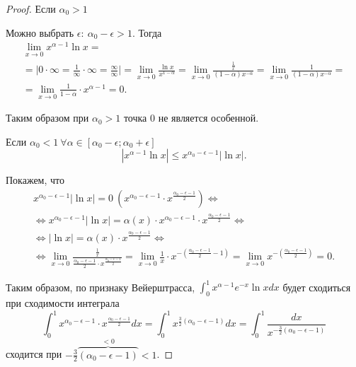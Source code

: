 \begin{enumerate}
\begin{proof}
            Если $ \alpha_0 > 1 $

            Можно выбрать $ \epsilon : \ \alpha_0 - \epsilon > 1 $. Тогда
            \begin{multline*}
                \underset{x \rightarrow 0}{\lim}x^{\alpha-1}\ln x = \\
                = \bigg|0 \cdot \infty = \frac{1}{\infty}\cdot \infty = \frac{\infty}{\infty}\bigg| = \underset{x \rightarrow 0}{\lim}\frac{\ln x}{x^{1-\alpha}} = \underset{x \rightarrow 0}{\lim} \frac{\frac{1}{x}}{(1-\alpha)x^{-\alpha}} = \underset{x \rightarrow 0}{\lim}\frac{1}{(1-\alpha)x^{-\alpha}} = \\
                = \underset{x \rightarrow 0}{\lim}\frac{1}{1-\alpha}\cdot x^{\alpha-1} = 0.
            \end{multline*}

            Таким образом при $ \alpha_0 > 1 $ точка $ 0 $ не является особенной.

            Если $ \alpha_0 < 1 \ \forall \alpha \in[\alpha_0 - \epsilon;\alpha_0 + \epsilon] $
            \[
                | x^{\alpha-1}\ln x | \leqslant x^{\alpha_0 - \epsilon -1}| \ln x |.
            \]

            Покажем, что
            \begin{multline*}
                x^{\alpha_0 - \epsilon - 1}| \ln x | = 0 \ \left(x^{\alpha_0 - \epsilon - 1}\cdot x^{\frac{\alpha_0 - \epsilon - 1}{2}}\right) \iff \\
                \iff x^{\alpha_0 - \epsilon - 1}| \ln x |  = \alpha(x)\cdot x^{\alpha_0 - \epsilon - 1} \cdot x^{\frac{\alpha_0 - \epsilon - 1}{2}} \iff \\
                \iff | \ln x | = \alpha(x) \cdot x^{\frac{\alpha_0 - \epsilon - 1}{2}} \iff \\
                \iff \underset{x \rightarrow 0}{\lim}\frac{\frac{1}{x}}{\frac{\alpha_0 - \epsilon - 1}{2}\cdot x^{\frac{\alpha_0 - \epsilon - 1}{2}}} = \underset{x \rightarrow 0}{\lim}\frac{1}{x}\cdot x^{-\left(\frac{\alpha_0 - \epsilon - 1}{2} - 1\right)} = \underset{x \rightarrow 0}{\lim} x^{-\left(\frac{\alpha_0 - \epsilon -1}{2}\right)} = 0.
            \end{multline*}

            Таким образом, по признаку Вейерштрасса, $ \int_{0}^{1}x^{\alpha-1}e^{-x}\ln x dx $ будет сходиться при сходимости интеграла
            \[
                \int_{0}^{1}x^{\alpha_0 - \epsilon - 1}\cdot x^{\frac{\alpha_0 - \epsilon - 1}{2}}dx = \int_{0}^{1}x^{\frac{3}{2}(\alpha_0 - \epsilon - 1)}dx = \int_{0}^{1}\frac{dx}{x^{-\frac{3}{2}(\alpha_0 - \epsilon - 1)}}
            \]
            сходится при $ -\frac{3}{2}\overbrace{(\alpha_0 - \epsilon - 1)}^{<0} < 1 $.


\end{proof}
\end{enumerate}
